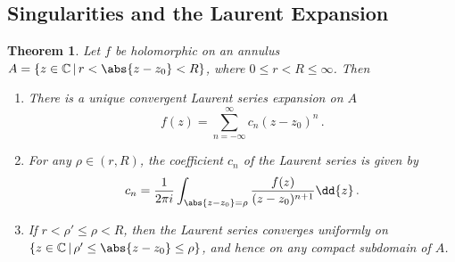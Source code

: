 \documentclass{article}
\theoremstyle{plain}\theoremheaderfont{\normalfont\itshape}\theorembodyfont{\rmfamily}\theoremseparator{.}\newtheorem*{rem}{Remark}\newtheorem*{ex}{Example}\newtheorem*{proof}{Proof}\newtheorem*{altp}{Alternative proof}
\theoremstyle{plain}\theoremheaderfont{\normalfont\bfseries}\theorembodyfont{\rmfamily}\theoremseparator{.}\newtheorem{thm}{Theorem}[section]\newtheorem{lem}[thm]{Lemma}\newtheorem{prop}[thm]{Proposition}\newtheorem*{cor}{Corollary}\newtheorem{defn}[thm]{Definition}\newtheorem{clm}[thm]{Claim}\newtheorem{clminproof}{Claim}
\theoremstyle{break}\theoremheaderfont{\normalfont\itshape}\theorembodyfont{\rmfamily}\theoremseparator{.\medskip}\newtheorem*{proofskip}{Proof}\newtheorem*{exs}{Examples}\newtheorem*{rems}{Remarks}
\theoremstyle{break}\theoremheaderfont{\normalfont\bfseries}\theorembodyfont{\rmfamily}\theoremseparator{.\medskip}\newtheorem{lemskip}[thm]{Lemma}\newtheorem{defnskip}[thm]{Definition}\newtheorem{propskip}[thm]{Proposition}\newtheorem{thmskip}[thm]{Theorem}
\numberwithin{equation}{section}
\begin{document}
	\subsection{Singularities and the Laurent Expansion}
	\begin{thm}
		Let \(f\) be holomorphic on an annulus \(A=\{z\in\mathbb{C}\,|\,r<\abs{z-z_0}<R\}\), where \(0\le r<R\le\infty\). Then
		\begin{enumerate}[topsep=0pt]
			\item[(i)] There is a unique convergent \textit{Laurent series expansion} on \(A\)
			\[f(z)=\sum_{n=-\infty}^{\infty}c_n(z-z_0)^n\,.\]
			\item[(ii)] For any \(\rho\in(r,R)\), the coefficient \(c_n\) of the Laurent series is given by
			\[c_n=\frac{1}{2\pi i}\int_{\abs{z-z_0}=\rho}\frac{f(z)}{(z-z_0)^{n+1}}\dd{z}\,.\]
			\item[(iii)] If \(r<\rho'\le\rho<R\), then the Laurent series converges uniformly on \(\{z\in\mathbb{C}\,|\,\rho'\le\abs{z-z_0}\le\rho\}\), and hence on any compact subdomain of \(A\).
		\end{enumerate}
	\end{thm}
\end{document}

